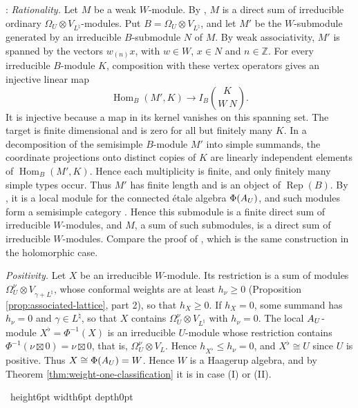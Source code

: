 \documentclass[leqno]{article}
\let\cal\relax
\newcommand{\cal}{\mathcal}
\newcommand{\Z}{\ensuremath{\mathbb{Z}}}
\renewcommand{\leq}{\ensuremath{\leqslant}}
\renewcommand{\geq}{\ensuremath{\geqslant}}
\newcommand{\qed}{\hfill \vrule height6pt  width6pt depth0pt}
\newcommand{\ot}{\otimes}
\DeclareMathOperator{\Rep}{Rep}
\newenvironment{proof}[1][]{\noindent {\it Proof #1} : }{\hbox{~}\qed
\smallskip
}
\numberwithin{equation}{section}
\begin{document}
\begin{proof}
\emph{Rationality.} Let $M$ be a weak $W$-module. By \cite{ABD04}, $M$ is a direct sum of irreducible ordinary $\Omega_U \ot V_{L^\natural}$-modules. Put $B = \Omega_U \ot V_{L^\natural}$, and let $M'$ be the $W$-submodule generated by an irreducible $B$-submodule $N$ of $M$. By weak associativity, $M'$ is spanned by the vectors $w_{(n)}x$, with $w \in W$, $x \in N$ and $n \in \Z$. For every irreducible $B$-module $K$, composition with these vertex operators gives an injective linear map
\[
\operatorname{Hom}_B(M',K) \to I_B\binom{K}{W\ N}.
\]
It is injective because a map in its kernel vanishes on this spanning set. The target is finite dimensional and is zero for all but finitely many $K$. In a decomposition of the semisimple $B$-module $M'$ into simple summands, the coordinate projections onto distinct copies of $K$ are linearly independent elements of $\operatorname{Hom}_B(M',K)$. Hence each multiplicity is finite, and only finitely many simple types occur. Thus $M'$ has finite length and is an object of $\Rep(B)$. By \cite{HKL15,CKM22}, it is a local module for the connected étale algebra $\Phi(\cal A_U)$, and such modules form a semisimple category \cite{DMNO13}. Hence this submodule is a finite direct sum of irreducible $W$-modules, and $M$, a sum of such submodules, is a direct sum of irreducible $W$-modules. Compare the proof of \cite[Proposition 5.3]{MoR24a}, which is the same construction in the holomorphic case.

\emph{Positivity.} Let $X$ be an irreducible $W$-module. Its restriction is a sum of modules $\Omega_U^\nu \ot V_{\gamma+L^\natural}$, whose conformal weights are at least $h_\nu \geq 0$ (Proposition \ref{prop:associated-lattice}, part 2), so that $h_X \geq 0$. If $h_X = 0$, some summand has $h_\nu = 0$ and $\gamma \in L^\natural$, so that $X$ contains $\Omega_U^\nu \ot V_{L^\natural}$ with $h_\nu = 0$. The local $\cal A_U$-module $X^\flat = \Phi^{-1}(X)$ is an irreducible $U$-module whose restriction contains $\Phi^{-1}(\nu \boxtimes 0) = \nu \boxtimes 0$, that is, $\Omega_U^\nu \ot V_L$. Hence $h_{X^\flat} \leq h_\nu = 0$, and $X^\flat \cong U$ since $U$ is positive. Thus $X \cong \Phi(\cal A_U) = W$. Hence $W$ is a Haagerup algebra, and by Theorem \ref{thm:weight-one-classification} it is in case (I) or (II).


\end{proof}
\end{document}
